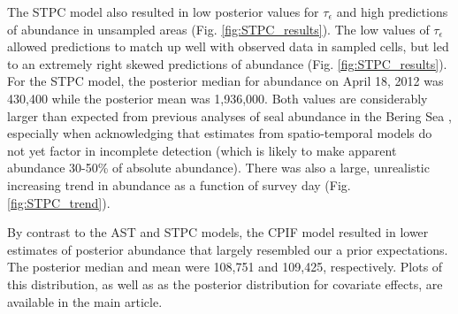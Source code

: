 \documentclass[12pt,fleqn]{article}
\begin{document}
\begin{flushleft}
\hspace{.5in}The STPC model also resulted in low posterior values for $\tau_\epsilon$ and high predictions of abundance in unsampled areas (Fig. \ref{fig:STPC_results}).  The low values of $\tau_\epsilon$ allowed predictions to match up well with observed data in sampled cells, but led to an extremely right skewed predictions of abundance (Fig. \ref{fig:STPC_results}).  For the STPC model, the posterior median for abundance on April 18, 2012 was 430,400 while the posterior mean was 1,936,000.  Both values are considerably larger than expected from previous analyses of seal abundance in the Bering Sea \citep[e.g.,][]{ConnEtAl2014,VerHoefEtAl2014}, especially when acknowledging that estimates from spatio-temporal models do not yet factor in incomplete detection (which is likely to make apparent abundance 30-50\% of absolute abundance).  There was also a large, unrealistic increasing trend in abundance as a function of survey day (Fig. \ref{fig:STPC_trend}).

\hspace{.5in}By contrast to the AST and STPC models, the CPIF model resulted in lower estimates of posterior abundance that largely resembled our a prior expectations.  The posterior median and mean were 108,751 and 109,425, respectively.  Plots of this distribution, as well as as the posterior distribution for covariate effects, are available in the main article.

\renewcommand{\refname}{Literature Cited}




\pagebreak


\end{flushleft}
\end{document}
